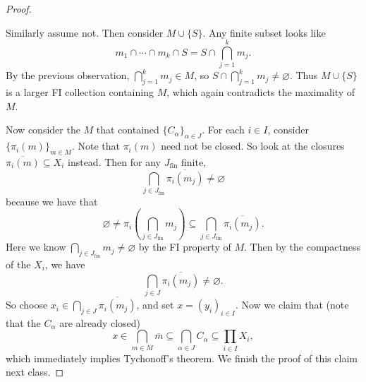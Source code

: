 \begin{proof}
\begin{enumerate}[(i)]
      Similarly assume not. Then consider
      $M \cup \{S\}$. Any finite subset looks like
      \[
        m_1 \cap \cdots \cap m_k \cap S = S \cap \bigcap_{j = 1}^k m_j.
      \]
      By the previous observation,
      $\bigcap_{j = 1}^k m_j \in M$, so
      $S \cap \bigcap_{j = 1}^k m_j \ne \varnothing$.
      Thus $M \cup \{S\}$ is a larger FI collection
      containing $M$, which again contradicts the
      maximality of $M$.
  \end{enumerate}
  Now consider the $M$ that contained
  $\{C_\alpha\}_{\alpha \in J}$. For each $i \in I$,
  consider $\{\pi_i(m)\}_{m \in M}$. Note
  that $\pi_i(m)$ need not be closed.
  So look at the closures $\overline{\pi_i(m)} \subseteq X_i$
  instead. Then for any $J_\text{fin}$ finite,
  \[
    \bigcap_{j \in J_\text{fin}} \overline{\pi_i(m_j)}
    \ne \varnothing
  \]
  because we have that
  \[
    \varnothing \ne \pi_i\left(\bigcap_{j \in J_\text{fin}} m_j\right)
    \subseteq \bigcap_{j \in J_\text{fin}} \overline{\pi_i(m_j)}.
  \]
  Here we know $\bigcap_{j \in J_\text{fin}} m_j \ne \varnothing$
  by the FI property of $M$. Then by the compactness
  of the $X_i$, we have
  \[
    \bigcap_{j \in J} \overline{\pi_i(m_j)}
    \ne \varnothing.
  \]
  So choose $x_i \in \bigcap_{j \in J} \overline{\pi_i(m_j)}$, and
  set $x = (y_i)_{i \in I}$. Now we claim that (note
  that the $C_\alpha$ are already closed)
  \[
    x \in
    \bigcap_{m \in M} \overline{m}
    \subseteq \bigcap_{\alpha \in J} C_\alpha
    \subseteq \prod_{i \in I} X_i,
  \]
  which immediately implies Tychonoff's theorem.
  We finish the proof of this claim next class.
\end{proof}
